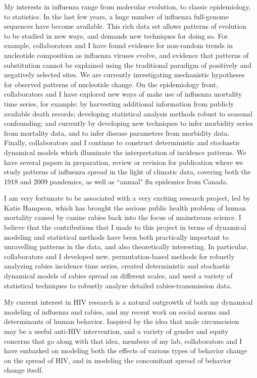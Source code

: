 \documentclass[12pt,a4paper]{article}
\begin{document}
My interests in influenza range from molecular evolution, to classic epidemiology, to statistics.  In the last few years, a huge number of influenza full-genome sequences have become available.  This rich data set allows patterns of evolution to be studied in new ways, and demands new techniques for doing so.  For example, collaborators and I have found evidence for non-random trends in nucleotide composition as influenza viruses evolve, and evidence that patterns of substitution cannot be explained using the traditional paradigm of positively and negatively selected sites.  We are currently investigating mechanistic hypotheses for observed patterns of nucleotide change.  On the epidemiology front, collaborators and I have explored new ways of make use of influenza mortality time series, for example: by harvesting additional information from publicly available death records; developing statistical analysis methods robust to seasonal confounding; and currently by developing new techniques to infer morbidity series from mortality data, and to infer disease parameters from morbidity data.  Finally, collaborators and I continue to construct deterministic and stochastic dynamical models which illuminate the interpretation of incidence patterns.  We have several papers in preparation, review or revision for publication where we study patterns of influenza spread in the light of climatic data, covering both the 1918 and 2009 pandemics, as well as ``annual" flu epidemics from Canada.

I am very fortunate to be associated with a very exciting research project, led by Katie Hampson, which has brought the serious public health problem of human mortality caused by canine rabies back into the focus of mainstream science.  I believe that the contributions that I made to this project in terms of dynamical modeling and statistical methods have been both practically important to unravelling patterns in the data, and also theoretically interesting.  In particular, collaborators and I developed new, permutation-based methods for robustly analyzing rabies incidence time series, created deterministic and stochastic dynamical models of rabies spread on different scales, and used a variety of statistical techniques to robustly analyze detailed rabies-transmission data.

My current interest in HIV research is a natural outgrowth of both my dynamical modeling of influenza and rabies, and my recent work on social norms and determinants of human behavior.  Inspired by the idea that male circumcision may be a useful anti-HIV intervention, and a variety of gender and equity concerns that go along with that idea, members of my lab, collaborators and I have embarked on modeling both the effects of various types of behavior change on the spread of HIV, and in modeling the concomitant spread of behavior change itself.
\end{document}
